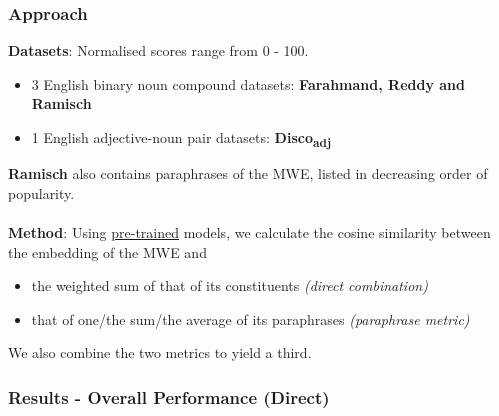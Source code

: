 \documentclass[english,svgnames,notes=hide,14pt,aspectratio=169]{beamer}
\begin{document}
\begin{frame}
\frametitle{Approach}
\textbf{Datasets}: Normalised scores range from 0 - 100.
\begin{itemize}
    \item 3 English binary noun compound datasets: \textbf{Farahmand, Reddy and Ramisch}
    \item 1 English adjective-noun pair datasets: \textbf{Disco\textsubscript{adj}}
\end{itemize}
\textbf{Ramisch} also contains paraphrases of the MWE, listed in decreasing order of popularity.\\~\\

\textbf{Method}: Using \uline{pre-trained} models, we calculate the cosine similarity between the embedding of the MWE and
\begin{itemize}
    \item the weighted sum of that of its constituents \textit{(direct combination)}
    \item that of one/the sum/the average of its paraphrases \textit{(paraphrase metric)}
\end{itemize}
We also combine the two metrics to yield a third.
\end{frame}


\begin{frame}
\frametitle{Results - Overall Performance (Direct)}
\begin{center}
\pgfplotsset{width=14cm,height=6cm}
\end{center}
\end{frame}
\end{document}
